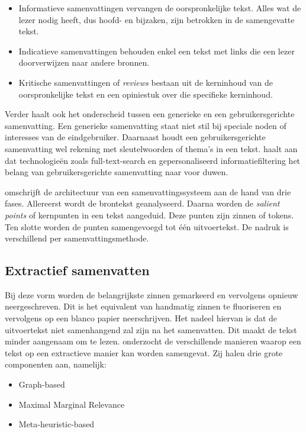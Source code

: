\begin{itemize}
	\item Informatieve samenvattingen vervangen de oorspronkelijke tekst. Alles wat de lezer nodig heeft, dus hoofd- en bijzaken, zijn betrokken in de samengevatte tekst.
	\item Indicatieve samenvattingen behouden enkel een tekst met links die een lezer doorverwijzen naar andere bronnen. 
	\item Kritische samenvattingen of \textit{reviews} bestaan uit de kerninhoud van de oorspronkelijke tekst en een opiniestuk over die specifieke kerninhoud.
\end{itemize}


Verder haalt \textcite{Hahn2000} ook het onderscheid tussen een generieke en een gebruikersgerichte samenvatting. Een generieke samenvatting staat niet stil bij speciale noden of interesses van de eindgebruiker. Daarnaast houdt een gebruikersgerichte samenvatting wel rekening met sleutelwoorden of thema's in een tekst. \textcite{Hahn2000} haalt aan dat technologieën zoals full-text-search en gepersonaliseerd informatiefiltering het belang van gebruikersgerichte samenvatting naar voor duwen.

\textcite{Hahn2000} omschrijft de architectuur van een samenvattingssysteem aan de hand van drie fases. Allereerst wordt de brontekst geanalyseerd. Daarna worden de \textit{salient points} of kernpunten in een tekst aangeduid. Deze punten zijn zinnen of tokens. Ten slotte worden de punten samengevoegd tot één uitvoertekst. De nadruk is verschillend per samenvattingsmethode.

\subsection{Extractief samenvatten}

Bij deze vorm worden de belangrijkste zinnen gemarkeerd en vervolgens opnieuw neergeschreven.  Dit is het equivalent van handmatig zinnen te fluoriseren en vervolgens op een blanco papier neerschrijven. Het nadeel hiervan is dat de uitvoertekst niet samenhangend zal zijn na het samenvatten. Dit maakt de tekst minder aangenaam om te lezen. \textcite{Verma2020} onderzocht de verschillende manieren waarop een tekst op een extractieve manier kan worden samengevat. Zij halen drie grote componenten aan, namelijk:

\begin{itemize}
	\item Graph-based
	\item Maximal Marginal Relevance
	\item Meta-heuristic-based
\end{itemize}

